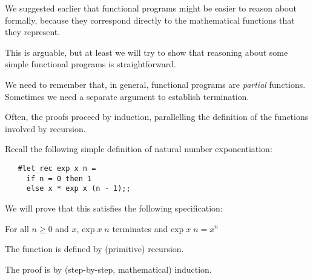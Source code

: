 \begin{slide*}


\vspace*{0.5cm}

We suggested earlier that functional programs might be easier to reason about
formally, because they correspond directly to the mathematical functions that
they represent.

This is arguable, but at least we will try to show that reasoning about some
simple functional programs is straightforward.

We need to remember that, in general, functional programs are {\em partial}
functions. Sometimes we need a separate argument to establish termination.

Often, the proofs proceed by induction, parallelling the definition of the
functions involved by recursion.

\end{slide*}



\begin{slide*}


\vspace*{0.5cm}

Recall the following simple definition of natural number exponentiation:

\begin{black}\begin{verbatim}
   #let rec exp x n =
     if n = 0 then 1
     else x * exp x (n - 1);;
\end{verbatim}\end{black}

We will prove that this satisfies the following specification:

{\red For all $n \geq 0$ and $x$, $\mbox{exp}\; x\; n$ terminates and
$\mbox{exp}\; x\; n = x^n$}

The function is defined by (primitive) recursion.

The proof is by (step-by-step, mathematical) induction.

\end{slide*}



